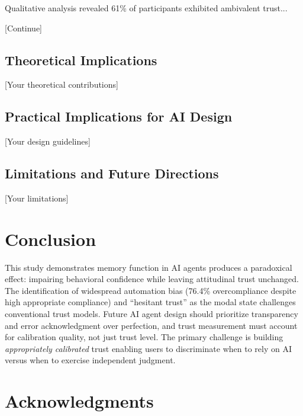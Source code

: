 \documentclass[12pt]{article}
\begin{document}
Qualitative analysis revealed 61\% of participants exhibited ambivalent trust...

[Continue]

\subsection{Theoretical Implications}

[Your theoretical contributions]

\subsection{Practical Implications for AI Design}

[Your design guidelines]

\subsection{Limitations and Future Directions}

[Your limitations]

\section{Conclusion}

This study demonstrates memory function in AI agents produces a paradoxical effect: impairing behavioral confidence while leaving attitudinal trust unchanged. The identification of widespread automation bias (76.4\% overcompliance despite high appropriate compliance) and ``hesitant trust'' as the modal state challenges conventional trust models. Future AI agent design should prioritize transparency and error acknowledgment over perfection, and trust measurement must account for calibration quality, not just trust level. The primary challenge is building \textit{appropriately calibrated} trust enabling users to discriminate when to rely on AI versus when to exercise independent judgment.

\section*{Acknowledgments}
\end{document}
